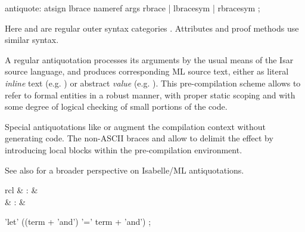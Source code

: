 \begin{isabellebody}
\begin{isamarkuptext}
  \begin{rail}
  antiquote: atsign lbrace nameref args rbrace | lbracesym | rbracesym
  ;
  \end{rail}

  Here \hyperlink{syntax.nameref}{\mbox{}} and \hyperlink{syntax.args}{\mbox{}} are regular outer syntax
  categories \cite{isabelle-isar-ref}.  Attributes and proof methods
  use similar syntax.

  \medskip A regular antiquotation  processes
  its arguments by the usual means of the Isar source language, and
  produces corresponding ML source text, either as literal
  \emph{inline} text (e.g. ) or abstract
  \emph{value} (e.g. ).  This pre-compilation
  scheme allows to refer to formal entities in a robust manner, with
  proper static scoping and with some degree of logical checking of
  small portions of the code.

  Special antiquotations like  or  augment the compilation context without generating code.  The
  non-ASCII braces \isa{{\isasymlbrace}} and \isa{{\isasymrbrace}} allow to delimit the
  effect by introducing local blocks within the pre-compilation
  environment.

  \medskip See also \cite{Wenzel-Chaieb:2007b} for a broader
  perspective on Isabelle/ML antiquotations.%
\end{isamarkuptext}%
\isamarkuptrue%
%
\isadelimmlantiq
%
\endisadelimmlantiq
%
\isatagmlantiq
%
\begin{isamarkuptext}%
\begin{matharray}{rcl}
  \hypertarget{ML antiquotation.let}{\hyperlink{ML antiquotation.let}{\mbox{}}} & : &  \\
  \hypertarget{ML antiquotation.note}{\hyperlink{ML antiquotation.note}{\mbox{}}} & : &  \\
  \end{matharray}

  \begin{rail}
  'let' ((term + 'and') '=' term + 'and')
  ;


\end{rail}
\end{isamarkuptext}
\end{isabellebody}
